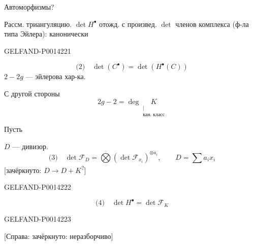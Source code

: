 Автоморфизмы?

Рассм. триангуляцию. \(\det H^\bullet\) отожд. с произвед. \(\det\)
членов комплекса (ф-ла типа Эйлера): канонически


\begin{GelfandAdjacentEvidence}{GELFAND-P001422}{1}

\[
\text{(2)}\quad\det(C^\bullet)=\det(H^\bullet(C))
\]
\(2-2g\) — эйлерова хар-ка.

С другой стороны
\[
2g-2=\deg\underset{\substack{|\\\text{кан. класс}}}{K}
\]

Пусть

\(D\) — дивизор.
\[
\text{(3)}\quad
\det\mathcal F_D=\bigotimes(\det\mathcal F_{x_i})^{\otimes a_i},
\qquad D=\sum a_i x_i
\]
[зачёркнуто: \(D\longrightarrow D+K\)\textsuperscript{?}]
\end{GelfandAdjacentEvidence}
\begin{GelfandAdjacentEvidence}{GELFAND-P001422}{2}


\[
\text{(4)}\quad\det H^\bullet=\det\mathcal F_K
\]
\end{GelfandAdjacentEvidence}
\begin{GelfandAdjacentEvidence}{GELFAND-P001422}{3}

[Справа: зачёркнуто: неразборчиво]
\end{GelfandAdjacentEvidence}
